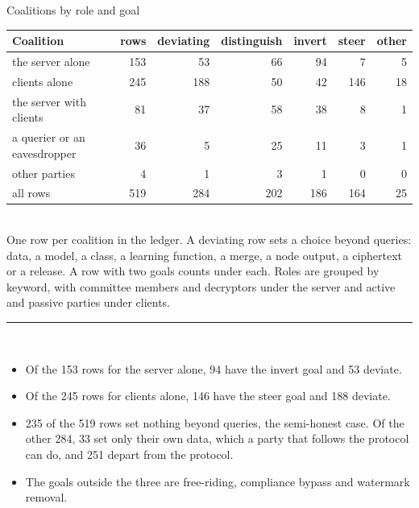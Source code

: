 \documentclass[aspectratio=169,10pt]{beamer}
\newcommand{\redline}{\textcolor{kred}{\rule{\textwidth}{1pt}}}
\begin{document}
\begin{frame}{Coalitions by role and goal}
  \begin{center}
  \footnotesize
  \setlength{\tabcolsep}{6pt}
  \begin{tabular}{@{}lrrrrrr@{}}
    \toprule
    Coalition & rows & deviating & distinguish & invert & steer & other\\
    \midrule
    the server alone              & 153 & 53  & 66 & 94 & 7   & 5\\
    clients alone                 & 245 & 188 & 50 & 42 & 146 & 18\\
    the server with clients       & 81  & 37  & 58 & 38 & 8   & 1\\
    a querier or an eavesdropper  & 36  & 5   & 25 & 11 & 3   & 1\\
    other parties                 & 4   & 1   & 3  & 1  & 0   & 0\\
    \midrule
    all rows                      & 519 & 284 & 202 & 186 & 164 & 25\\
    \bottomrule
  \end{tabular}\\[0.3em]
  \scriptsize One row per coalition in the ledger. A deviating row sets a choice beyond queries: data, a model, a class, a learning function, a merge, a node output, a ciphertext or a release. A row with two goals counts under each. Roles are grouped by keyword, with committee members and decryptors under the server and active and passive parties under clients.
  \end{center}
  \vspace{0.3em}
  \redline\\[0.3em]
  \small
  \begin{itemize}
    \item Of the 153 rows for the server alone, 94 have the invert goal and 53 deviate.
    \item Of the 245 rows for clients alone, 146 have the steer goal and 188 deviate.
    \item 235 of the 519 rows set nothing beyond queries, the semi-honest case. Of the other 284, 33 set only their own data, which a party that follows the protocol can do, and 251 depart from the protocol.
    \item The goals outside the three are free-riding, compliance bypass and watermark removal.
  \end{itemize}
\end{frame}
\end{document}
